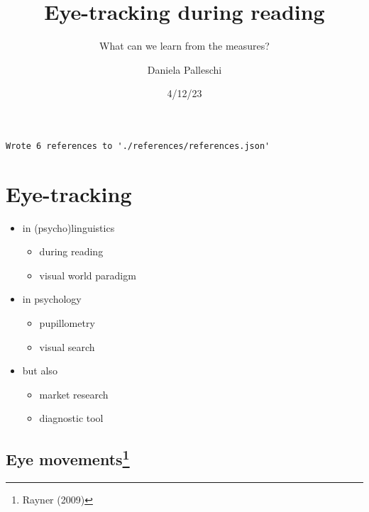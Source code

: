 \documentclass[
  letterpaper,
  DIV=11,
  numbers=noendperiod]{scrartcl}
\title{Eye-tracking during reading}
\subtitle{What can we learn from the measures?}
\author{Daniela Palleschi}
\date{4/12/23}
\providecommand{\tightlist}{%
  \setlength{\itemsep}{0pt}\setlength{\parskip}{0pt}}\usepackage{longtable,booktabs,array}
\renewcommand*\contentsname{Table of contents}
\newcommand\contentsname{Table of contents}
\begin{document}
\maketitle
\ifdefined\Shaded\renewenvironment{Shaded}{\begin{tcolorbox}[interior hidden, boxrule=0pt, borderline west={3pt}{0pt}{shadecolor}, enhanced, frame hidden, breakable, sharp corners]}{\end{tcolorbox}}\fi

\renewcommand*\contentsname{Table of contents}
{
\hypersetup{linkcolor=}
\setcounter{tocdepth}{3}
\tableofcontents
}
\begin{verbatim}
Wrote 6 references to './references/references.json'
\end{verbatim}

\hypertarget{eye-tracking}{%
\section{Eye-tracking}\label{eye-tracking}}

\begin{itemize}
\tightlist
\item
  in (psycho)linguistics

  \begin{itemize}
  \tightlist
  \item
    during reading
  \item
    visual world paradigm
  \end{itemize}
\item
  in psychology

  \begin{itemize}
  \tightlist
  \item
    pupillometry
  \item
    visual search
  \end{itemize}
\item
  but also

  \begin{itemize}
  \tightlist
  \item
    market research
  \item
    diagnostic tool
  \end{itemize}
\end{itemize}

\hypertarget{eye-movements}{%
\subsection[Eye movements]{\texorpdfstring{Eye
movements\footnote{Rayner (2009)}}{Eye movements}}\label{eye-movements}}
\end{document}
